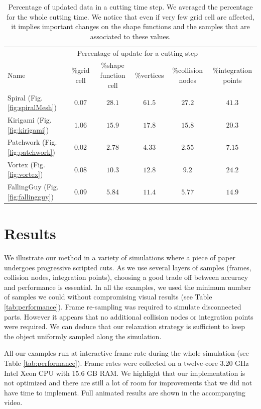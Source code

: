 \documentclass[11pt, oneside, a4paper]{memoir}
\begin{document}
\begin{table}[!ht]
\centering
\begin{tabular}{l|ccccc}
& \multicolumn{4}{c}{Percentage of update for a cutting step} \\
Name & \%grid cell &\%shape function cell & \%vertices & \%collision nodes & \%integration points \\ \hline
Spiral (Fig. \ref{fig:spiralMesh}) & $0.07$ & $28.1$ & $61.5$ & $27.2$ & $41.3$\\
Kirigami (Fig. \ref{fig:kirigami}) & $1.06$ & $15.9$ & $17.8$ & $15.8$ & $20.3$\\
Patchwork (Fig. \ref{fig:patchwork}) & $0.02$ & $2.78$ & $4.33$ & $2.55$ & $7.15$\\
Vortex (Fig. \ref{fig:vortex}) & $0.08$ & $10.3$ & $12.8$ & $9.2$ & $24.2$\\
FallingGuy (Fig. \ref{fig:fallingguy}) & $0.09$ & $5.84$ & $11.4$ & $5.77$ & $14.9$\\
\end{tabular}
\caption{\label{tab:incrementalUpdate} Percentage of updated data in a cutting time step. We averaged the percentage for the whole cutting time. We notice that even if very few grid cell are affected, it implies important changes on the shape functions and the samples that are associated to these values.}
\end{table}

\section{Results} \label{sec:results}

We illustrate our method in a variety of simulations where a piece of paper undergoes progressive scripted cuts. As we use several layers of samples (frames, collision nodes, integration points), choosing a good trade off between accuracy and performance is essential. In all the examples, we used the minimum number of samples we could without compromising visual results (see Table \ref{tab:performance}). Frame re-sampling was required to simulate disconnected parts. However it appears that no additional collision nodes or integration points were required. We can deduce that our relaxation strategy is sufficient to keep the object uniformly sampled along the simulation.

All our examples run at interactive frame rate during the whole simulation (see Table \ref{tab:performance}). Frame rates were collected on a twelve-core 3.20 GHz Intel Xeon CPU with 15.6 GB RAM. We highlight that our implementation is not optimized and there are still a lot of room for improvements that we did not have time to implement. Full animated results are shown in the accompanying video.
\end{document}
